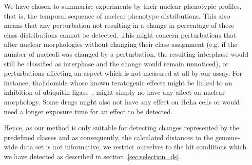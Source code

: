 We have chosen to summarize experiments by their nuclear phenotypic
profiles, that is, the temporal sequence of nuclear phenotype
distributions. This also means that any perturbation not resulting in
a change in percentage of these class distributions cannot be
detected. This might concern perturbations that alter nuclear
morphologies without changing their class assignment (e.g. if the
number of nucleoli was changed by a perturbation, the resulting
interphase would still be classified as interphase and the change
would remain unnoticed), or perturbations affecting an aspect which is
not measured at all by our assay. For instance, thalidomide whose known teratogenic
effects might be linked to an inhibition of ubiquitin
ligase~\cite{pmid20223979}, might simply no have any affect on nuclear
morphology. Some drugs might also not have any effect on HeLa cells or
would need a longer exposure time for an effect to be detected. 


Hence, as our method is only suitable for detecting changes
represented by the predefined classes and as consequently, the
calculated distances to the genome-wide data set is not informative, we
restrict ourselves to the hit conditions which we have detected as
described in section~\ref{sec:selection_ds}. 


%

